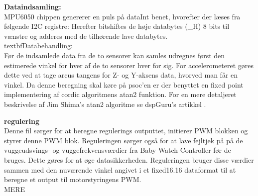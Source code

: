 \textbf{Dataindsamling:} \\
MPU6050 chippen genererer en puls på dataInt benet, hvorefter der læses fra følgende I2C registre:
Herefter bitshiftes de høje databytes (\_H) 8 bits til vænstre og adderes med de tilhørende lave databytes.\\
textbf{Databehandling:} \\
Før de indsamlede data fra de to sensorer kan samles udregnes først den estimerede vinkel for hver af de to sensorer hver for sig. For accelerometeret gøres dette ved at tage arcus tangens for Z- og Y-aksens data, hvorved man får en vinkel. Da denne beregning skal køre på psoc'en er der benyttet en fixed point implementering af cordic algoritmens atan2 funktion. For en mere detaljeret beskrivelse af Jim Shima's atan2 algoritme se dspGuru's artikkel \citep{website:atan}.


\textbf{regulering} \\
Denne fil sørger for at beregne regulerings outputtet, initierer PWM blokken og styrer denne PWM blok. Reguleringen sørger også for at lave fejltjek på på de vuggeudsvings- og vuggefrekvensværdier fra Baby Watch Controller før de bruges. Dette gøres for at øge datasikkerheden. Reguleringen bruger disse værdier sammen med den nuværende vinkel angivet i et fixed16.16 dataformat til at beregne et output til motorstyringens PWM. 
\\ MERE \\
